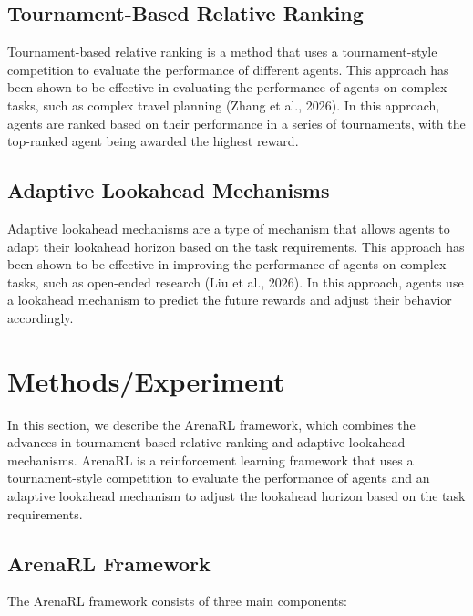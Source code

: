 \documentclass[12pt]{article}
\begin{document}
\subsection{Tournament-Based Relative Ranking}

Tournament-based relative ranking is a method that uses a tournament-style competition to evaluate the performance of different agents. This approach has been shown to be effective in evaluating the performance of agents on complex tasks, such as complex travel planning (Zhang et al., 2026). In this approach, agents are ranked based on their performance in a series of tournaments, with the top-ranked agent being awarded the highest reward.

\subsection{Adaptive Lookahead Mechanisms}

Adaptive lookahead mechanisms are a type of mechanism that allows agents to adapt their lookahead horizon based on the task requirements. This approach has been shown to be effective in improving the performance of agents on complex tasks, such as open-ended research (Liu et al., 2026). In this approach, agents use a lookahead mechanism to predict the future rewards and adjust their behavior accordingly.

\section{Methods/Experiment}

In this section, we describe the ArenaRL framework, which combines the advances in tournament-based relative ranking and adaptive lookahead mechanisms. ArenaRL is a reinforcement learning framework that uses a tournament-style competition to evaluate the performance of agents and an adaptive lookahead mechanism to adjust the lookahead horizon based on the task requirements.

\subsection{ArenaRL Framework}

The ArenaRL framework consists of three main components:
\end{document}
